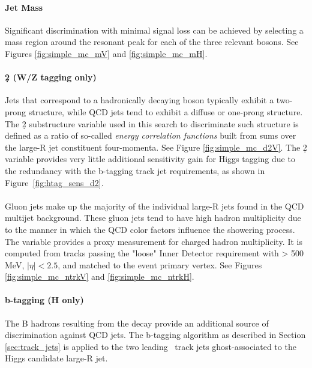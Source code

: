 \paragraph{Jet Mass}
Significant discrimination with minimal signal loss can be achieved by selecting a mass region around the resonant peak for each of the three relevant bosons.
See Figures \ref{fig:simple_mc_mV} and \ref{fig:simple_mc_mH}.

\paragraph{\d2 (W/Z tagging only)}
Jets that correspond to a hadronically decaying boson typically exhibit a two-prong structure, while QCD jets tend to exhibit a diffuse or one-prong structure.
The \d2 substructure variable used in this search to discriminate such structure is defined as a ratio of so-called \textit{energy correlation functions} \cite{Larkoski_2013} built from sums over the large-R jet constituent four-momenta.
See Figure \ref{fig:simple_mc_d2V}.
The \d2 variable provides very little additional sensitivity gain for Higgs tagging due to the redundancy with the b-tagging track jet requirements, as shown in Figure~\ref{fig:htag_sens_d2}.

\paragraph{\ntrk}
Gluon jets make up the majority of the individual large-R jets found in the QCD multijet background.
These gluon jets tend to have high hadron multiplicity due to the manner in which the QCD color factors influence the showering process.
The \ntrk variable provides a proxy measurement for charged hadron multiplicity.
It is computed from tracks passing the "loose" Inner Detector requirement with \pt > 500 MeV, $|\eta| < 2.5$, and matched to the event primary vertex.
See Figures \ref{fig:simple_mc_ntrkV} and \ref{fig:simple_mc_ntrkH}.

\paragraph{b-tagging (H only)}
The B hadrons resulting from the \Hbb decay provide an additional source of discrimination against QCD jets.
The b-tagging algorithm as described in Section \ref{sec:track_jets} is applied to the two leading \pt\ track jets ghost-associated to the Higgs candidate large-R jet.

